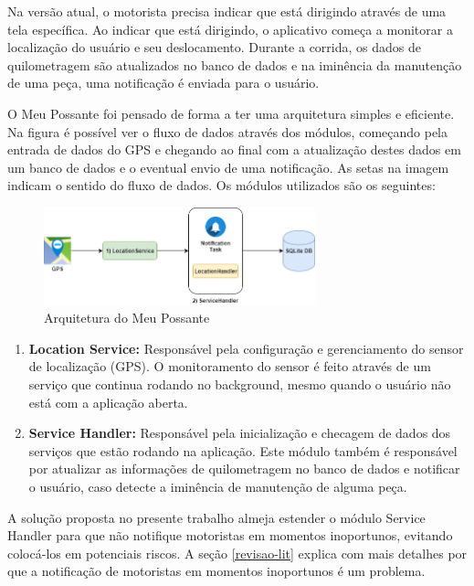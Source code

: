 Na versão atual, o motorista precisa indicar que está dirigindo através de uma tela
específica. Ao indicar que está dirigindo, o aplicativo começa a monitorar a localização
do usuário e seu deslocamento. Durante a corrida, os dados de quilometragem são atualizados
no banco de dados e na iminência da manutenção de uma peça, uma notificação é enviada para o
usuário.

O Meu Possante foi pensado de forma a ter uma arquitetura simples e eficiente. Na figura
é possível ver o fluxo de dados através dos módulos, começando pela entrada de dados do GPS
e chegando ao final com a atualização destes dados em um banco de dados e o eventual envio de
uma notificação. As setas na imagem indicam o sentido do fluxo de dados. Os módulos utilizados
são os seguintes:

\begin{figure}[h]
  \centering
  \includegraphics[width=0.7\textwidth]{images/arquitetura-meu-possante.png}
  \caption{Arquitetura do Meu Possante}
  \label{meu-possante-arquitetura}
\end{figure}

\begin{enumerate}
  \item \textbf{Location Service:} Responsável pela configuração e gerenciamento do sensor de localização (GPS).
    O monitoramento do sensor é feito através de um serviço que continua rodando no background,
    mesmo quando o usuário não está com a aplicação aberta.
  \item \textbf{Service Handler:} Responsável pela inicialização e checagem de dados dos serviços
    que estão rodando na aplicação. Este módulo também é responsável por atualizar as informações
    de quilometragem no banco de dados e notificar o usuário, caso detecte a iminência de
    manutenção de alguma peça.
\end{enumerate}

A solução proposta no presente trabalho almeja estender o módulo Service Handler para que não notifique motoristas
em momentos inoportunos, evitando colocá-los em potenciais riscos. A seção \ref{revisao-lit} explica com mais detalhes
por que a notificação de motoristas em momentos inoportunos é um problema.

